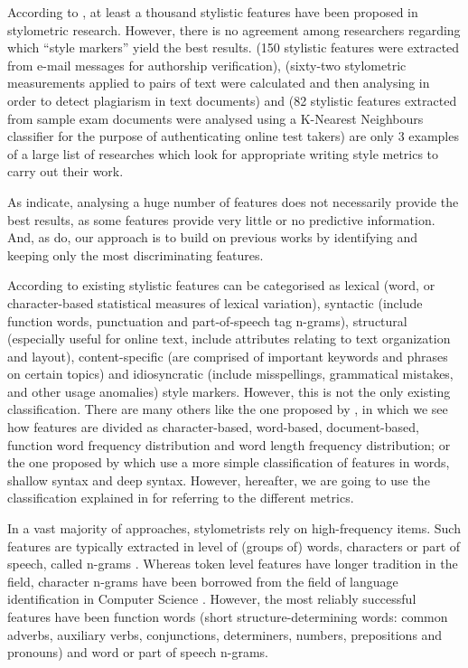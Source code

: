 According to \cite{rudman1997state}, at least a thousand stylistic features have been proposed in stylometric research. However, there is no agreement among researchers regarding which ``style markers'' yield the best results. \cite{chen2011authorship} (150 stylistic features were extracted from e-mail messages for authorship verification), \cite{gruner2005tool} (sixty-two stylometric measurements applied to pairs of text were calculated and then analysing in order to detect plagiarism in text documents) and \cite{canales2011stylometry} (82 stylistic features extracted from sample exam documents were analysed using a K-Nearest Neighbours classifier for the purpose of authenticating online test takers) are only 3 examples of a large list of researches which look for appropriate writing style metrics to carry out their work.

As \cite{brocardo2013authorship} indicate, analysing a huge number of features does not necessarily provide the best results, as some features provide very little or no predictive information. And, as \cite{brocardo2013authorship} do, our approach is to build on previous works by identifying and keeping only the most discriminating features.

According to \cite{abbasi2008writeprints} existing stylistic features can be categorised as lexical (word, or character-based statistical measures of lexical variation), syntactic (include function words, punctuation and part-of-speech tag n-grams), structural (especially useful for online text, include attributes relating to text organization and layout), content-specific (are comprised of important keywords and phrases on certain topics) and idiosyncratic (include misspellings, grammatical mistakes, and other usage anomalies) style markers. However, this is not the only existing classification. There are many others like the one proposed by \cite{corney2001identifying}, in which we see how features are divided as character-based, word-based, document-based, function word frequency distribution and word length frequency distribution; or the one proposed by \cite{cfgstylo} which use a more simple classification of features in words, shallow syntax and deep syntax. However, hereafter, we are going to use the classification explained in \cite{abbasi2008writeprints} for referring to the different metrics.

In a vast majority of approaches, stylometrists rely on high-frequency items. Such features are typically extracted in level of (groups of) words, characters or part of speech, called n-grams \citep{kjell1994discrimination}. Whereas token level features have longer tradition in the field, character n-grams have been borrowed from the field of language identification in Computer Science \citep{stamatatos2009survey, eder2011style}. However, the most reliably successful features have been function words (short structure-determining words: common adverbs, auxiliary verbs, conjunctions, determiners, numbers, prepositions and pronouns) and word or part of speech n-grams. 

